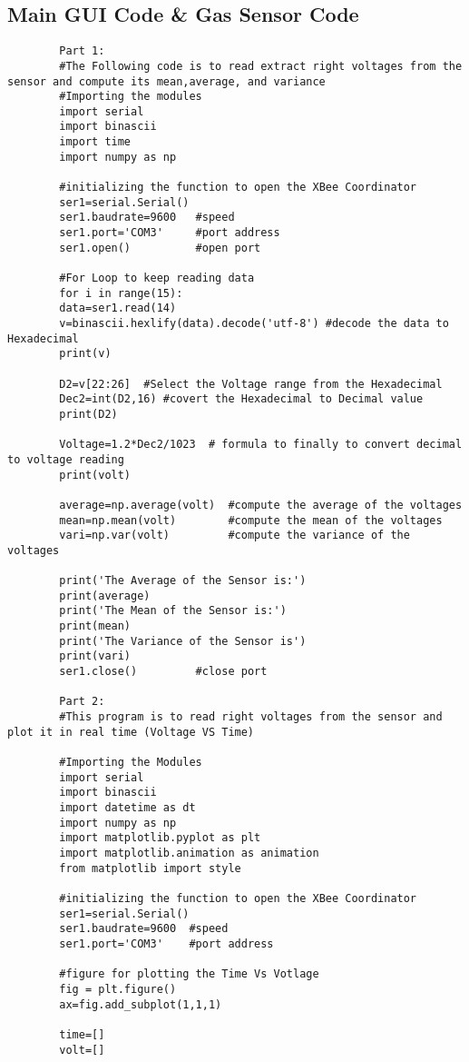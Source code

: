 \subsection{Main GUI Code \& Gas Sensor Code}
	\begin{lstlisting}		
		Part 1:		
		#The Following code is to read extract right voltages from the sensor and compute its mean,average, and variance				
		#Importing the modules		
		import serial		
		import binascii		
		import time		
		import numpy as np
				
		#initializing the function to open the XBee Coordinator		
		ser1=serial.Serial()		
		ser1.baudrate=9600   #speed		
		ser1.port='COM3'     #port address		
		ser1.open()          #open port		
		
		#For Loop to keep reading data		
		for i in range(15):		
		data=ser1.read(14)		
		v=binascii.hexlify(data).decode('utf-8') #decode the data to Hexadecimal		
		print(v)
				
		D2=v[22:26]  #Select the Voltage range from the Hexadecimal		
		Dec2=int(D2,16) #covert the Hexadecimal to Decimal value 		
		print(D2)
				
		Voltage=1.2*Dec2/1023  # formula to finally to convert decimal to voltage reading						
		print(volt)
				
		average=np.average(volt)  #compute the average of the voltages		
		mean=np.mean(volt)        #compute the mean of the voltages		
		vari=np.var(volt)         #compute the variance of the voltages
				
		print('The Average of the Sensor is:')		
		print(average)		
		print('The Mean of the Sensor is:')		
		print(mean)		
		print('The Variance of the Sensor is')		
		print(vari)		
		ser1.close()         #close port
		
		Part 2:		
		#This program is to read right voltages from the sensor and plot it in real time (Voltage VS Time)		
		
		#Importing the Modules		
		import serial		
		import binascii		
		import datetime as dt		
		import numpy as np		
		import matplotlib.pyplot as plt		
		import matplotlib.animation as animation	
		from matplotlib import style
			
		#initializing the function to open the XBee Coordinator		
		ser1=serial.Serial()		
		ser1.baudrate=9600  #speed		
		ser1.port='COM3'    #port address
				
		#figure for plotting the Time Vs Votlage
		fig = plt.figure()		
		ax=fig.add_subplot(1,1,1)
				
		time=[]		
		volt=[]		
		

\end{lstlisting}
